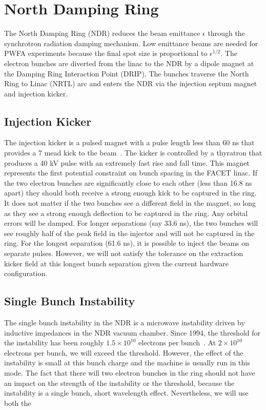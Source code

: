 \documentclass[aps,prl,preprint,groupedaddress]{revtex4-1}
\begin{document}
\section{North Damping Ring}
The North Damping Ring (NDR) reduces the beam emittance $\epsilon$ through the synchrotron radiation damping mechanism. Low emittance beams are needed for PWFA experiments because the final spot size is proportional to $\epsilon^{1/2}$. The electron bunches are diverted from the linac to the NDR by a dipole magnet at the Damping Ring Interaction Point (DRIP). The bunches traverse the North Ring to Linac (NRTL) arc and enters the NDR via the injection septum magnet and injection kicker.  

\subsection{Injection Kicker}
The injection kicker is a pulsed magnet with a pulse length less than 60 ns that provides a 7 mead kick to the beam~\cite{kicker}. The kicker is controlled by a thyratron that produces a 40 kV pulse with an extremely fast rise and fall time. This magnet represents the first potential constraint on bunch spacing in the FACET linac. If the two electron bunches are significantly close to each other (less than 16.8 ns apart) they should both receive a strong enough kick to be captured in the ring. It does not matter if the two bunches see a different field in the magnet, so long as they see a strong enough deflection to be captured in the ring. Any orbital errors will be damped. For longer separations (say 33.6 ns), the two bunches will see roughly half of the peak field in the injector and will not be captured in the ring. For the longest separation (61.6 ns), it is possible to inject the beams on separate pulses. However, we will not satisfy the tolerance on the extraction kicker field at this longest bunch separation given the current hardware configuration.

\subsection{Single Bunch Instability}
The single bunch instability in the NDR is a microwave instability driven by inductive impedances in the NDR vacuum chamber. Since 1994, the threshold for the instability has been roughly $1.5 \times 10^{10}$ electrons per bunch~\cite{sawtooth}. At $2 \times 10^{10}$ electrons per bunch, we will exceed the threshold. However, the effect of the instability is small at this bunch charge and the machine is usually run in this mode. The fact that there will two electron bunches in the ring should not have an impact on the strength of the instability or the threshold, because the instability is a single bunch, short wavelength effect. Nevertheless, we will use both the 
\end{document}
